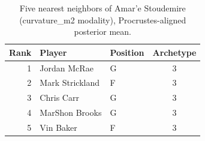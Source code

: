 \begin{table}[htbp]
  \centering\small
  \begin{tabular}{rllc}
    \toprule
    Rank & Player & Position & Archetype \\
    \midrule
    1 & Jordan McRae & G & 3 \\
    2 & Mark Strickland & F & 3 \\
    3 & Chris Carr & G & 3 \\
    4 & MarShon Brooks & G & 3 \\
    5 & Vin Baker & F & 3 \\
    \bottomrule
  \end{tabular}
  \caption{Five nearest neighbors of Amar'e Stoudemire (curvature_m2 modality), Procrustes-aligned posterior mean.}
  \label{tab:Amar_e_Stoudemire_neighbors_curvature_m2}
\end{table}


